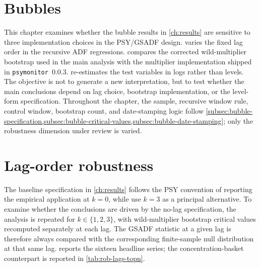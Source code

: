 \section{Bubbles}

This chapter examines whether the bubble results in \cref{ch:results} are sensitive to three implementation choices in the PSY/GSADF design.  varies the fixed lag order in the recursive ADF regressions.  compares the corrected wild-multiplier bootstrap used in the main analysis with the multiplier implementation shipped in \texttt{psymonitor}~0.0.3.  re-estimates the test variables in logs rather than levels. The objective is not to generate a new interpretation, but to test whether the main conclusions depend on lag choice, bootstrap implementation, or the level-form specification. Throughout the chapter, the sample, recursive window rule, control window, bootstrap count, and date-stamping logic follow \cref{subsec:bubble-specification,subsec:bubble-critical-values,subsec:bubble-date-stamping}; only the robustness dimension under review is varied.


\section{Lag-order robustness}
\label{sec:rob-lags}

The baseline specification in \cref{ch:results} follows the PSY convention of reporting the empirical application at $k=0$, while \citet[footnote~22]{phillipsShiYu2015a} use $k=3$ as a principal alternative. To examine whether the conclusions are driven by the no-lag specification, the analysis is repeated for $k\in\{1,2,3\}$, with wild-multiplier bootstrap critical values recomputed separately at each lag. The GSADF statistic at a given lag is therefore always compared with the corresponding finite-sample null distribution at that same lag.  reports the sixteen headline series; the concentration-basket counterpart is reported in \cref{tab:rob-lags-topn}.

